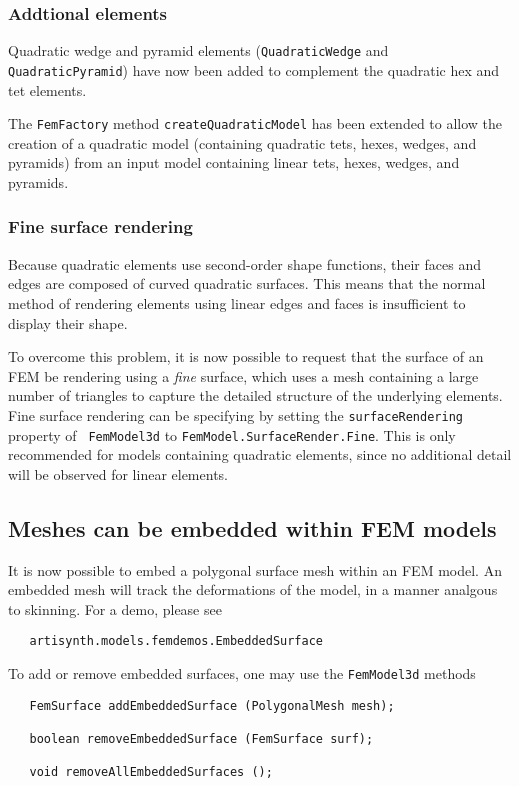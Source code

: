 \documentclass{article}
\begin{document}
\subsubsection*{Addtional elements}

Quadratic wedge and pyramid elements ({\tt QuadraticWedge} and {\tt
QuadraticPyramid}) have now been added to complement the quadratic hex
and tet elements.

The {\tt FemFactory} method {\tt createQuadraticModel} has been
extended to allow the creation of a quadratic model (containing
quadratic tets, hexes, wedges, and pyramids) from an input model
containing linear tets, hexes, wedges, and pyramids.

\subsubsection*{Fine surface rendering}

Because quadratic elements use second-order shape functions, their
faces and edges are composed of curved quadratic surfaces. This means
that the normal method of rendering elements using linear edges and
faces is insufficient to display their shape. 

To overcome this problem, it is now possible to request that the
surface of an FEM be rendering using a {\it fine} surface, which uses
a mesh containing a large number of triangles to capture the detailed
structure of the underlying elements. Fine surface rendering can be
specifying by setting the {\tt surfaceRendering} property of {\tt
FemModel3d} to {\tt FemModel.SurfaceRender.Fine}. This is only
recommended for models containing quadratic elements, since no additional
detail will be observed for linear elements.

\subsection*{Meshes can be embedded within FEM models}

It is now possible to embed a polygonal surface mesh within an FEM
model. An embedded mesh will track the deformations of the model, in a
manner analgous to skinning. For a demo, please see
\begin{verbatim}
   artisynth.models.femdemos.EmbeddedSurface
\end{verbatim}

To add or remove embedded surfaces, one may use the {\tt FemModel3d}
methods
\begin{lstlisting}
   FemSurface addEmbeddedSurface (PolygonalMesh mesh);

   boolean removeEmbeddedSurface (FemSurface surf);

   void removeAllEmbeddedSurfaces ();
\end{lstlisting}
\end{document}
